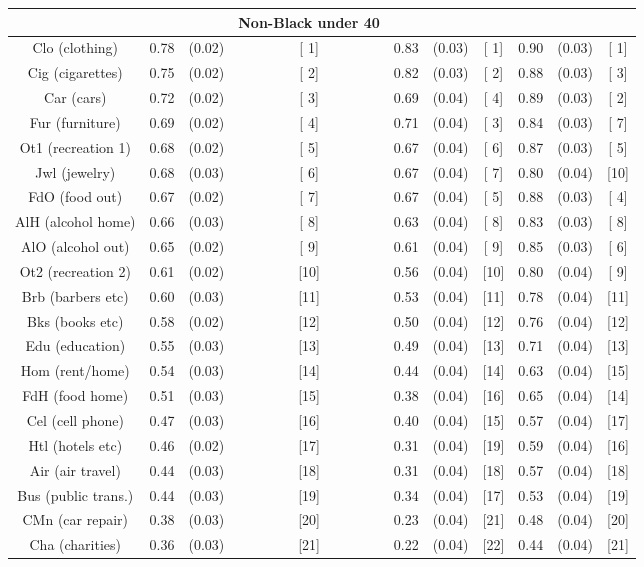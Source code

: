\documentclass[a4paper,10pt]{article}
\begin{document}
\begin{tabular}{cccccccccc}
\hline \hline
 & & & \textbf{Non-Black under 40} & & & & & \\
\hline
Clo (clothing)&0.78&(0.02)&[ 1] & 0.83&(0.03)&[ 1] & 0.90 & (0.03) & [ 1] \\
Cig (cigarettes)&0.75&(0.02)&[ 2] & 0.82&(0.03)&[ 2] & 0.88 & (0.03) & [ 3] \\
Car (cars)&0.72&(0.02)&[ 3] & 0.69&(0.04)&[ 4] & 0.89 & (0.03) & [ 2] \\
Fur (furniture)&0.69&(0.02)&[ 4] & 0.71&(0.04)&[ 3] & 0.84 & (0.03) & [ 7] \\
Ot1 (recreation 1)&0.68&(0.02)&[ 5] & 0.67&(0.04)&[ 6] & 0.87 & (0.03) & [ 5] \\
Jwl (jewelry)&0.68&(0.03)&[ 6] & 0.67&(0.04)&[ 7] & 0.80 & (0.04) & [10] \\
FdO (food out)&0.67&(0.02)&[ 7] & 0.67&(0.04)&[ 5] & 0.88 & (0.03) & [ 4] \\
AlH (alcohol home)&0.66&(0.03)&[ 8] & 0.63&(0.04)&[ 8] & 0.83 & (0.03) & [ 8] \\
AlO (alcohol out)&0.65&(0.02)&[ 9] & 0.61&(0.04)&[ 9] & 0.85 & (0.03) & [ 6] \\
Ot2 (recreation 2)&0.61&(0.02)&[10] & 0.56&(0.04)&[10] & 0.80 & (0.04) & [ 9] \\
Brb (barbers etc)&0.60&(0.03)&[11] & 0.53&(0.04)&[11] & 0.78 & (0.04) & [11] \\
Bks (books etc)&0.58&(0.02)&[12] & 0.50&(0.04)&[12] & 0.76 & (0.04) & [12] \\
Edu (education)&0.55&(0.03)&[13] & 0.49&(0.04)&[13] & 0.71 & (0.04) & [13] \\
Hom (rent/home)&0.54&(0.03)&[14] & 0.44&(0.04)&[14] & 0.63 & (0.04) & [15] \\
FdH (food home)&0.51&(0.03)&[15] & 0.38&(0.04)&[16] & 0.65 & (0.04) & [14] \\
Cel (cell phone)&0.47&(0.03)&[16] & 0.40&(0.04)&[15] & 0.57 & (0.04) & [17] \\
Htl (hotels etc)&0.46&(0.02)&[17] & 0.31&(0.04)&[19] & 0.59 & (0.04) & [16] \\
Air (air travel)&0.44&(0.03)&[18] & 0.31&(0.04)&[18] & 0.57 & (0.04) & [18] \\
Bus (public trans.)&0.44&(0.03)&[19] & 0.34&(0.04)&[17] & 0.53 & (0.04) & [19] \\
CMn (car repair)&0.38&(0.03)&[20] & 0.23&(0.04)&[21] & 0.48 & (0.04) & [20] \\
Cha (charities)&0.36&(0.03)&[21] & 0.22&(0.04)&[22] & 0.44 & (0.04) & [21] \\

\end{tabular}
\end{document}
